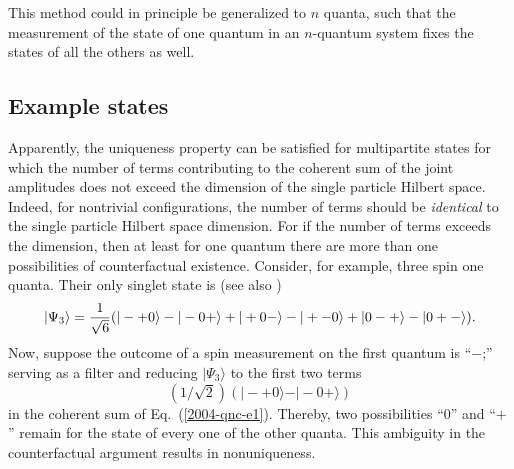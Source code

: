 \documentclass{aipproc}
\begin{document}
This method could in principle be generalized to $n$ quanta, such that
the measurement of the state of one quantum
in an $n$-quantum system fixes
the states of all the others as well.


\subsection{Example states}

Apparently, the uniqueness property can be satisfied for multipartite states
for which the number of terms contributing to
the coherent sum of the joint amplitudes does not exceed the dimension of the
single particle Hilbert space.
Indeed, for nontrivial configurations, the number of terms should be {\em identical}
to the single particle Hilbert space dimension.
For if the number of terms exceeds the dimension, then
at least for one quantum there are more than one possibilities of counterfactual existence.
Consider, for example, three spin one quanta.
Their only singlet state is (see also \cite{kok-02})
\begin{equation}
\vert \Psi_3 \rangle
= {1\over \sqrt{6}}(
\vert - + 0\rangle
-
\vert - 0 +\rangle
+
\vert + 0 - \rangle
-
\vert + - 0\rangle
+
\vert 0 - + \rangle
-
\vert 0 + - \rangle
).
\label{2004-qnc-e1}
\end{equation}
Now, suppose the outcome of a spin measurement on the first quantum is ``$-$;''
serving as a filter and reducing $\vert \Psi_3 \rangle$
to the first two terms
$$({1/ \sqrt{2}})(
\vert - + 0\rangle
-
\vert - 0 +\rangle
)$$
in the coherent sum of Eq.~(\ref{2004-qnc-e1}).
Thereby, two possibilities ``$0$''
and ``$+$'' remain for the state of every one of the other quanta.
This ambiguity in the counterfactual argument results in nonuniqueness.
\end{document}
